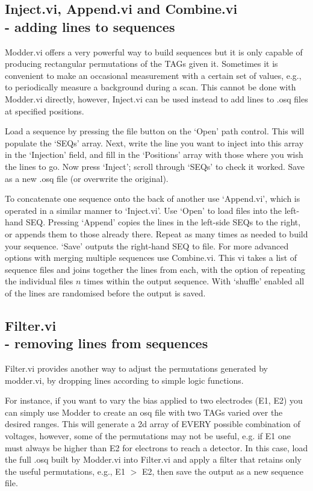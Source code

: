\documentclass[10pt,a4paper]{article}
\begin{document}
\subsection[Inject.vi, Append.vi and Combine.vi]{Inject.vi, Append.vi and Combine.vi\\ %
	\normalsize - adding lines to sequences}
Modder.vi offers a very powerful way to build sequences but it is only capable of producing rectangular permutations of the TAGs given it.  Sometimes it is convenient to make an occasional measurement with a certain set of values, e.g., to periodically measure a background during a scan.  This cannot be done with Modder.vi directly, however, Inject.vi can be used instead to add lines to .osq files at specified positions.

Load a sequence by pressing the file button on the `Open' path control.  This will populate the `SEQs' array.  Next, write the line you want to inject into this array in the `Injection' field, and fill in the `Positions' array with those where you wish the lines to go.  Now press `Inject'; scroll through `SEQs'  to check it worked.  Save as a new .osq file (or overwrite the original).

To concatenate one sequence onto the back of another use `Append.vi', which is operated in a  similar manner to `Inject.vi'.  Use `Open' to load files into the left-hand SEQ. Pressing `Append' copies the lines in the left-side SEQs to the right, or appends them to those already there.  Repeat as many times as needed to build your sequence. `Save' outputs the right-hand SEQ to file. For more advanced options with merging multiple sequences use Combine.vi. This vi takes a list of sequence files and joins together the lines from each, with the option of repeating the individual files $n$ times within the output sequence.  With `shuffle' enabled all of the lines are randomised before the output is saved.

\subsection[Filter.vi]{Filter.vi\\ %
	\normalsize - removing lines from sequences}
Filter.vi provides another way to adjust the permutations generated by modder.vi, by dropping lines according to simple logic functions.  

For instance, if you want to vary the bias applied to two electrodes (E1, E2) you can simply use Modder to create an osq file with two TAGs varied over the desired ranges.  This will generate a 2d array of EVERY possible combination of voltages, however, some of the permutations may not be useful, e.g. if E1 one must always be higher than E2 for electrons to reach a detector.  In this case, load the full .osq built by Modder.vi into Filter.vi and apply a filter that retains only the useful permutations, e.g., E1 $>$ E2, then save the output as a new sequence file.
\end{document}
